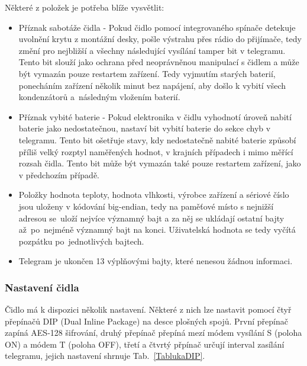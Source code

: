 \newpage{}

Některé z položek je potřeba blíže vysvětlit:

\begin{itemize}
	\item Příznak sabotáže čidla - Pokud čidlo pomocí integrovaného spínače detekuje uvolnění krytu z montážní desky, pošle výstrahu přes rádio do přijímače, tedy změní pro nejbližší a všechny následující vysílání tamper bit v telegramu. Tento bit slouží jako ochrana před neoprávněnou manipulací s čidlem a může být vymazán pouze restartem zařízení. Tedy vyjmutím starých baterií, ponecháním zařízení několik minut bez napájení, aby došlo k vybití všech kondenzátorů a~následným vložením baterií.
\item Příznak vybité baterie - Pokud elektronika v čidlu vyhodnotí úroveň nabití baterie jako nedostatečnou, nastaví bit vybití baterie do sekce chyb v telegramu. Tento bit ošetřuje stavy, kdy nedostatečně nabité baterie způsobí příliš velký rozptyl naměřených hodnot, v krajních případech i mimo měřící rozsah čidla. Tento bit může být vymazán také pouze restartem zařízení, jako v předchozím případě.
\item Položky hodnota teploty, hodnota vlhkosti, výrobce zařízení a sériové číslo jsou uloženy v kódování big-endian, tedy na paměťové místo s nejnižší adresou se~uloží nejvíce významný bajt a za něj se ukládají ostatní bajty až~po~nejméně významný bajt na konci. Uživatelská hodnota se tedy vyčítá pozpátku po~jednotlivých bajtech.
\item Telegram je ukončen 13 výplňovými bajty, které nenesou žádnou informaci.
\end{itemize}


\subsubsection{Nastavení čidla}
Čidlo má k dispozici několik nastavení. Některé z nich lze nastavit pomocí čtyř přepínačů DIP (Dual Inline Package) na desce plošných spojů.
První přepínač zapíná AES-128 šifrování, druhý přepínač přepíná mezí módem vysílání S (poloha ON) a módem T (poloha OFF), třetí a čtvrtý přpínač určují interval zasílání telegramu, jejich nastavení shrnuje Tab.~\ref{TablukaDIP}.


